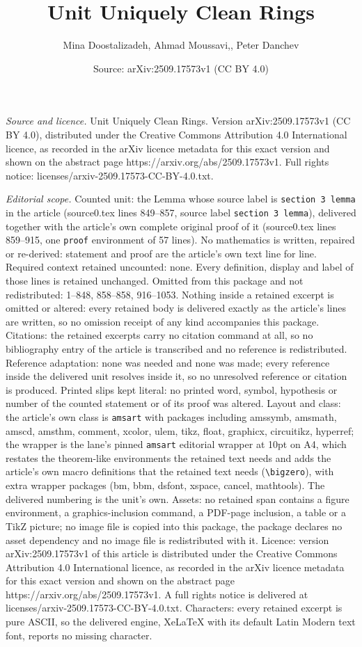 \documentclass[10pt,a4paper]{amsart}
\title[Unit Uniquely Clean Rings]{Unit Uniquely Clean Rings}
\author{Mina Doostalizadeh, Ahmad Moussavi,, Peter Danchev}
\date{Source: arXiv:2509.17573v1 (CC BY 4.0)}
\begin{document}
\maketitle

\noindent\emph{Source and licence.} Unit Uniquely Clean Rings. Version arXiv:2509.17573v1 (CC BY 4.0), distributed under the Creative Commons Attribution 4.0 International licence, as recorded in the arXiv licence metadata for this exact version and shown on the abstract page https://arxiv.org/abs/2509.17573v1. Full rights notice: licenses/arxiv-2509.17573-CC-BY-4.0.txt.\par\smallskip

\noindent\textit{Editorial scope.} Counted unit: the Lemma whose source label is \texttt{section 3 lemma} in the article (source0.tex lines 849--857, source label \texttt{section 3 lemma}), delivered together with the article's own complete original proof of it (source0.tex lines 859--915, one \texttt{proof} environment of 57 lines). No mathematics is written, repaired or re-derived: statement and proof are the article's own text line for line. Required context retained uncounted: none. Every definition, display and label of those lines is retained unchanged. Omitted from this package and not redistributed: 1--848, 858--858, 916--1053. Nothing inside a retained excerpt is omitted or altered: every retained body is delivered exactly as the article's lines are written, so no omission receipt of any kind accompanies this package. Citations: the retained excerpts carry no citation command at all, so no bibliography entry of the article is transcribed and no reference is redistributed. Reference adaptation: none was needed and none was made; every reference inside the delivered unit resolves inside it, so no unresolved reference or citation is produced. Printed slips kept literal: no printed word, symbol, hypothesis or number of the counted statement or of its proof was altered. Layout and class: the article's own class is \texttt{amsart} with packages including amssymb, amsmath, amscd, amsthm, comment, xcolor, ulem, tikz, float, graphicx, circuitikz, hyperref; the wrapper is the lane's pinned \texttt{amsart} editorial wrapper at 10pt on A4, which restates the theorem-like environments the retained text needs and adds the article's own macro definitions that the retained text needs (\texttt{\textbackslash bigzero}), with extra wrapper packages (bm, bbm, dsfont, xspace, cancel, mathtools). The delivered numbering is the unit's own. Assets: no retained span contains a figure environment, a graphics-inclusion command, a PDF-page inclusion, a table or a TikZ picture; no image file is copied into this package, the package declares no asset dependency and no image file is redistributed with it. Licence: version arXiv:2509.17573v1 of this article is distributed under the Creative Commons Attribution 4.0 International licence, as recorded in the arXiv licence metadata for this exact version and shown on the abstract page https://arxiv.org/abs/2509.17573v1. A full rights notice is delivered at licenses/arxiv-2509.17573-CC-BY-4.0.txt. Characters: every retained excerpt is pure ASCII, so the delivered engine, XeLaTeX with its default Latin Modern text font, reports no missing character.
\end{document}
